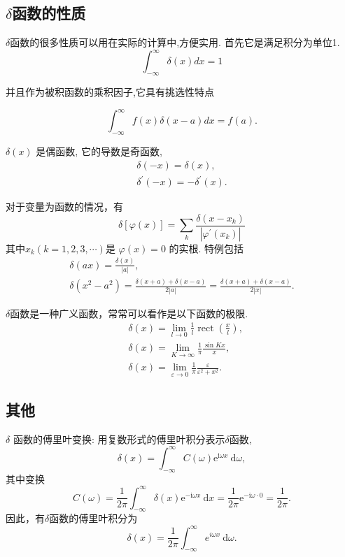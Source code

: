 \subsection{$\delta$函数的性质}
$\delta$函数的很多性质可以用在实际的计算中,方便实用. 首先它是满足积分为单位1.
$$
\int_{-\infty}^{\infty} \delta(x) d x=1
$$

并且作为被积函数的乘积因子,它具有挑选性特点

$$
\int_{-\infty}^{\infty} f(x) \delta(x-a) d x=f(a).
$$

$\delta(x)$ 是偶函数, 它的导数是奇函数,
$$
\begin{gathered}
\delta(-x)=\delta(x), \\
\delta^{\prime}(-x)=-\delta^{\prime}(x) .
\end{gathered}
$$

对于变量为函数的情况，有
\begin{equation}
    \delta[\varphi(x)]=\sum_k \frac{\delta\left(x-x_k\right)}{\left|\varphi^{\prime}\left(x_k\right)\right|}
\end{equation}
其中$x_k(k=1,2,3, \cdots)$是
$\varphi(x)=0$ 的实根.
特例包括
\begin{equation}
    \begin{gathered}
    \delta(a x)=\frac{\delta(x)}{|a|}, \\
    \delta\left(x^2-a^2\right)=\frac{\delta(x+a)+\delta(x-a)}{2|a|}=\frac{\delta(x+a)+\delta(x-a)}{2|x|} .
    \end{gathered}
\end{equation}

$\delta$函数是一种广义函数，常常可以看作是以下函数的极限.
\begin{equation}
    \begin{aligned}
    & \delta(x)=\lim _{l \rightarrow 0} \frac{1}{l} \operatorname{rect}\left(\frac{x}{l}\right), \\
    & \delta(x)=\lim _{K \rightarrow \infty} \frac{1}{\pi} \frac{\sin K x}{x}, \\
    & \delta(x)=\lim _{\varepsilon \rightarrow 0} \frac{1}{\pi} \frac{\varepsilon}{\varepsilon^2+x^2} .
    \end{aligned}
\end{equation}

\subsection{其他}
$\delta$ 函数的傅里叶变换: 用复数形式的傅里叶积分表示$\delta$函数,
$$
\delta(x)=\int_{-\infty}^{\infty} C(\omega) \mathrm{e}^{\mathrm{i} \omega x} \mathrm{~d} \omega,
$$
其中变换
$$
C(\omega)=\frac{1}{2 \pi} \int_{-\infty}^{\infty} \delta(x) \mathrm{e}^{-\mathrm{i} \omega x} \mathrm{~d} x=\frac{1}{2 \pi} \mathrm{e}^{-\mathrm{i} \omega \cdot 0}=\frac{1}{2 \pi} .
$$
因此，有$\delta$函数的傅里叶积分为
$$
\delta(x)=\frac{1}{2 \pi} \int_{-\infty}^{\infty} e^{i \omega x} \mathrm{~d} \omega .
$$

